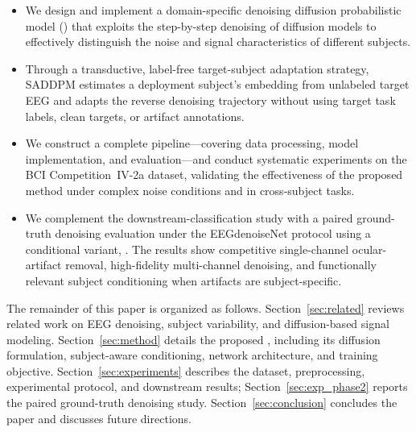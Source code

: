 \begin{itemize}
  \item We design and implement a domain-specific denoising diffusion probabilistic model (\saddpm{}) that exploits the step-by-step denoising of diffusion models to effectively distinguish the noise and signal characteristics of different subjects.

  \item Through a transductive, label-free target-subject adaptation strategy, SADDPM estimates a deployment subject's embedding from unlabeled target EEG and adapts the reverse denoising trajectory without using target task labels, clean targets, or artifact annotations.

  \item We construct a complete pipeline---covering data processing, model implementation, and evaluation---and conduct systematic experiments on the BCI Competition~IV-2a dataset, validating the effectiveness of the proposed method under complex noise conditions and in cross-subject tasks.

  \item We complement the downstream-classification study with a paired ground-truth denoising evaluation under the EEGdenoiseNet protocol using a conditional variant, \saddpmcond{}. The results show competitive single-channel ocular-artifact removal, high-fidelity multi-channel denoising, and functionally relevant subject conditioning when artifacts are subject-specific.
\end{itemize}

The remainder of this paper is organized as follows.
Section~\ref{sec:related} reviews related work on EEG denoising, subject variability, and diffusion-based signal modeling.
Section~\ref{sec:method} details the proposed \saddpm{}, including its diffusion formulation, subject-aware conditioning, network architecture, and training objective. Section~\ref{sec:experiments} describes the dataset, preprocessing, experimental protocol, and downstream results; Section~\ref{sec:exp_phase2} reports the paired ground-truth denoising study. Section~\ref{sec:conclusion} concludes the paper and discusses future directions.
